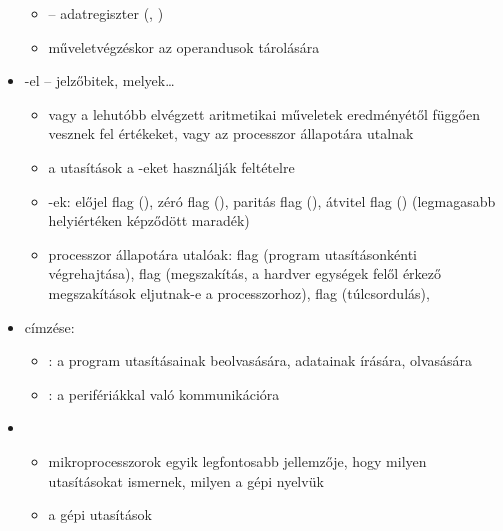 \documentclass[main.tex]{subfiles}
\begin{document}
\begin{itemize}
\begin{itemize}
      \item {} – adatregiszter
      (, )

      \item műveletvégzéskor az operandusok tárolására
    \end{itemize}

    \item {}-el – jelzőbitek, melyek\dots
    \begin{itemize}
      \item vagy a lehutóbb elvégzett aritmetikai
      műveletek eredményétől függően vesznek fel értékeket,
      vagy az processzor állapotára utalnak

      \item a  utasítások
      a -eket használják feltételre

      \item {}-ek:
      előjel flag (),
      zéró flag (),
      paritás flag (),
      átvitel flag ()
      (legmagasabb helyiértéken képződött maradék)

      \item processzor állapotára utalóak:
       flag (program utasításonkénti végrehajtása),
       flag (megszakítás,
      a hardver egységek felől érkező megszakítások
      eljutnak-e a processzorhoz),
       flag (túlcsordulás),
    \end{itemize}

    \item {} címzése:
    \begin{itemize}
      \item {}:
      a program utasításainak beolvasására,
      adatainak írására, olvasására

      \item {}:
      a perifériákkal való kommunikációra
    \end{itemize}

    \item {}
    \begin{itemize}
      \item mikroprocesszorok egyik legfontosabb jellemzője,
      hogy milyen utasításokat ismernek, milyen a gépi nyelvük

      \item a gépi utasítások 
      

\end{itemize}
\end{itemize}
\end{document}

